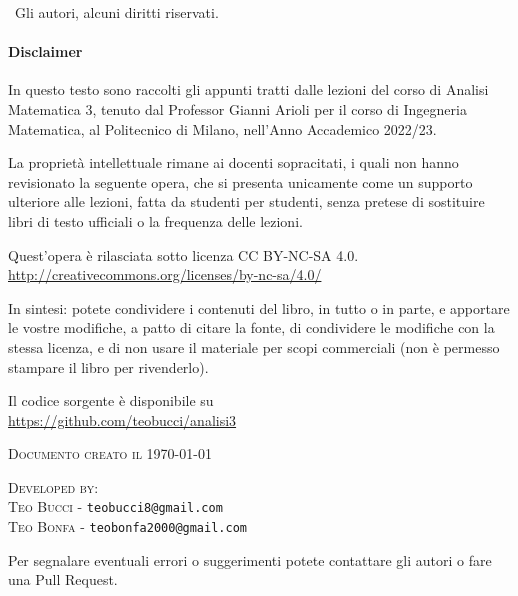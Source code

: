 
\textcopyright \ Gli autori, alcuni diritti riservati.

\paragraph{Disclaimer} In questo testo sono raccolti gli appunti tratti dalle lezioni del corso di Analisi Matematica 3, tenuto dal Professor Gianni Arioli per il corso di Ingegneria Matematica, al Politecnico di Milano, nell'Anno Accademico 2022/23.

La proprietà intellettuale rimane ai docenti sopracitati, i quali non hanno revisionato la seguente opera, che si presenta unicamente come un supporto ulteriore alle lezioni, fatta da studenti per studenti, senza pretese di sostituire libri di testo ufficiali o la frequenza delle lezioni.

Quest'opera è rilasciata sotto licenza CC BY-NC-SA 4.0.\\
\url{http://creativecommons.org/licenses/by-nc-sa/4.0/}

In sintesi: potete condividere i contenuti del libro, in tutto o in parte, e apportare le vostre modifiche, a patto di citare la fonte, di condividere le modifiche con la stessa licenza, e di non usare il materiale per scopi commerciali (non è permesso stampare il libro per rivenderlo).

Il codice sorgente \latex è disponibile su \\
\url{https://github.com/teobucci/analisi3}


\textsc{Documento creato il \today}


\textsc{Developed by:}\\
\textsc{Teo Bucci} - \texttt{teobucci8@gmail.com}\\
\textsc{Teo Bonfa} - \texttt{teobonfa2000@gmail.com}


Per segnalare eventuali errori o suggerimenti potete contattare gli autori o fare una Pull Request.

